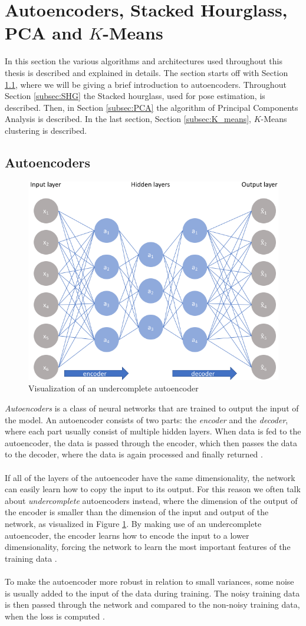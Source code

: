 \documentclass[./main.tex]{subfiles}
\begin{document}
\section{Autoencoders, Stacked Hourglass, PCA and $K$-Means}\label{sec:algorithms}
In this section the various algorithms and architectures used throughout this thesis is described and explained in details. The section starts off with Section \ref{subsec:AE}, where we will be giving a brief introduction to autoencoders. Throughout Section \ref{subsec:SHG} the Stacked hourglass, used for pose estimation, is described. Then, in Section \ref{subsec:PCA} the algorithm of Principal Components Analysis is described. In the last section, Section \ref{subsec:K_means}, $K$-Means clustering is described.

\subsection{Autoencoders}\label{subsec:AE}
\begin{figure}[htbp]
    \centering
    \includegraphics[width = 7 cm]{entities/AE.png}
    \caption{Visualization of an undercomplete autoencoder \cite{AE}}
    \label{fig:AE}
\end{figure}
\noindent \textit{Autoencoders} is a class of neural networks that are trained to output the input of the model. An autoencoder consists of two parts: the \textit{encoder} and the \textit{decoder}, where each part usually consist of multiple hidden layers. When data is fed to the autoencoder, the data is passed through the encoder, which then passes the data to the decoder, where the data is again processed and finally returned \cite{DeepLearning}. 
\\
\\
If all of the layers of the autoencoder have the same dimensionality, the network can easily learn how to copy the input to its output. For this reason we often talk about \textit{undercomplete} autoencoders instead, where the dimension of the output of the encoder is smaller than the dimension of the input and output of the network, as visualized in Figure \ref{fig:AE}. By making use of an undercomplete autoencoder, the encoder learns how to encode the input to a lower dimensionality, forcing the network to learn the most important features of the training data \cite{DeepLearning}.
\\
\\
To make the autoencoder more robust in relation to small variances, some noise is usually added to the input of the data during training. The noisy training data is then passed through the network and compared to the non-noisy training data, when the loss is computed \cite{DeepLearning}.
\end{document}
